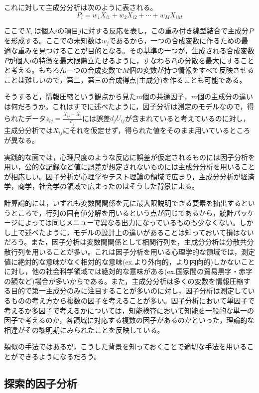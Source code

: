 \documentclass[
  a4paper,
]{ltjsbook}
\begin{document}
これに対して主成分分析は次のように表される。
\[ P_{i} = w_1X_{i1} + w_2X_{i2} + \cdots + w_MX_{iM} \]

ここで\(X_{i.}\)は個人\(i\)の項目\(j\)に対する反応を表し，この重み付き線型結合で主成分\(P\)を形成する。ここでの未知数は\(w_j\)であるから，一つの合成変数に作るための最適な重みを見つけることが目的となる。その基準の一つが，生成される合成変数\(P\)が個人\(i\)の特徴を最大限際立たせるように，すなわち\(P_i\)の分散を最大にすることと考える。もちろん一つの合成変数で\(M\)個の変数が持つ情報をすべて反映させることは難しいので，第二，第三の合成得点(主成分)を作ることも可能である。

そうすると，情報圧縮という観点から見た\(m\)個の共通因子，\(m\)個の主成分の違いは何だろうか。これはすでに述べたように，因子分析は測定のモデルなので，得られたデータ\(z_{ij}=\frac{X_{ij}-\bar{X_j}}{\sigma_j}\)には誤差\(d_jU_{ij}\)が含まれていると考えているのに対し，主成分分析では\(X_{ij}\)にそれを仮定せず，得られた値をそのまま用いているところが異なる。

実践的な面では，心理尺度のような反応に誤差が仮定されるものには因子分析を用い，公的な記録など値に誤差が想定されないものには主成分分析を用いることが相応しい。因子分析が心理学やテスト理論の領域で広まり，主成分分析が経済学，商学，社会学の領域で広まったのはそうした背景による。

計算論的には，いずれも変数間関係を元に最大限説明できる要素を抽出するというところで，行列の固有値分解を用いるという点が同じであるから，統計パッケージによっては同じメニューで異なる出力になっているものも少なくない。しかし上で述べたように，モデルの設計上の違いがあることは知っておいて損はないだろう。また，因子分析は変数間関係として相関行列を，主成分分析は分散共分散行列を用いることが多い。これは因子分析を用いる心理学的な領域では，測定値に絶対的な意味がなく相対的な意味(ex.より外向的，より内向的)しかないことに対し，他の社会科学領域では絶対的な意味がある(ex.国家間の貿易黒字・赤字の額など)場合が多いからである。また，主成分分析は多くの変数を情報圧縮する目的で第一主成分のみに注目することが多いのに対し，因子分析は測定しているものの考え方から複数の因子を考えることが多い。因子分析において単因子で考えるか多因子で考えるかについては，知能検査において知能を一般的な単一の因子で考えるのか，各領域に対応する複数の因子があるのかといった，理論的な相違がその黎明期にみられたことを反映している。

類似の手法ではあるが，こうした背景を知っておくことで適切な手法を用いることができるようになるだろう。

\subsection{探索的因子分析}\label{ux63a2ux7d22ux7684ux56e0ux5b50ux5206ux6790}
\end{document}
